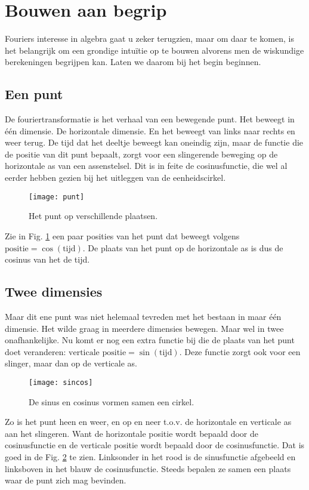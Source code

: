 \documentclass[11pt,fleqn]{book} %
\begin{document}
\section{Bouwen aan begrip}

Fouriers interesse in algebra gaat u zeker terugzien, maar om daar te komen, is het belangrijk om een grondige intuïtie op te bouwen alvorens men de wiskundige berekeningen begrijpen kan. Laten we daarom bij het begin beginnen.

\subsection{Een punt}
De fouriertransformatie is het verhaal van een bewegende punt. Het beweegt in één dimensie. De horizontale dimensie. En het beweegt van links naar rechts en weer terug. De tijd dat het deeltje beweegt kan oneindig zijn, maar de functie die de positie van dit punt bepaalt, zorgt voor een slingerende beweging op de horizontale as van een assenstelsel. Dit is in feite de cosinusfunctie, die wel al eerder hebben gezien bij het uitleggen van de eenheidscirkel.
\begin{figure}[h]
	\centering\texttt{[image: punt]}
	\caption{Het punt op verschillende plaatsen.}
	\label{fig:punt}
\end{figure}

Zie in Fig. \ref{fig:punt} een paar posities van het punt dat beweegt volgens $\text{positie}=\cos{(\text{tijd})}$. De plaats van het punt op de horizontale as is dus de cosinus van het de tijd.

\subsection{Twee dimensies}
Maar dit ene punt was niet helemaal tevreden met het bestaan in maar één dimensie. Het wilde graag in meerdere dimensies bewegen. Maar wel in twee onafhankelijke. Nu komt er nog een extra functie bij die de plaats van het punt doet veranderen: $\text{verticale positie}=\sin{(\text{tijd})}$. Deze functie zorgt ook voor een slinger, maar dan op de verticale as.
\begin{figure}[h]
	\centering\texttt{[image: sincos]}
	\caption{De sinus en cosinus vormen samen een cirkel.}
	\label{fig:sincos}
\end{figure}

Zo is het punt heen en weer, en op en neer t.o.v. de horizontale en verticale as aan het slingeren. Want de horizontale positie wordt bepaald door de cosinusfunctie en de verticale positie wordt bepaald door de cosinusfunctie. Dat is goed in de Fig. \ref{fig:sincos} te zien. Linksonder in het rood is de sinusfunctie afgebeeld en linksboven in het blauw de cosinusfunctie. Steeds bepalen ze samen een plaats waar de punt zich mag bevinden.
\end{document}
